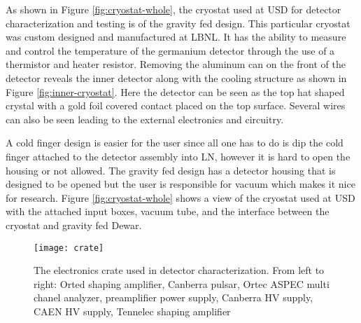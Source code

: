 As shown in Figure \ref{fig:cryostat-whole}, the cryostat used at USD for detector characterization and testing is of the gravity fed design.
This particular cryostat was custom designed and manufactured at LBNL.
It has the ability to measure and control the temperature of the germanium detector through the use of a thermistor and heater resistor.
Removing the aluminum can on the front of the detector reveals the inner detector along with the cooling structure as shown in Figure \ref{fig:inner-cryostat}.
Here the detector can be seen as the top hat shaped crystal with a gold foil covered contact placed on the top surface.
Several wires can also be seen leading to the external electronics and circuitry.

A cold finger design is easier for the user since all one has to do is dip the cold finger attached to the detector assembly into LN, however it is hard to open the housing or not allowed.
The gravity fed design has a detector housing that is designed to be opened but the user is responsible for vacuum which makes it nice for research.
Figure \ref{fig:cryostat-whole} shows a view of the cryostat used at USD with the attached input boxes, vacuum tube, and the interface between the cryostat and gravity fed Dewar.
\begin{figure}[htpb]
\centering
\texttt{[image: crate]}
\caption{The electronics crate used in detector characterization. From left to right: Orted shaping amplifier, Canberra pulsar, Ortec ASPEC multi chanel analyzer, preamplifier power supply, Canberra HV supply, CAEN HV supply, Tennelec shaping amplifier}
\label{fig:crate}
\end{figure}

